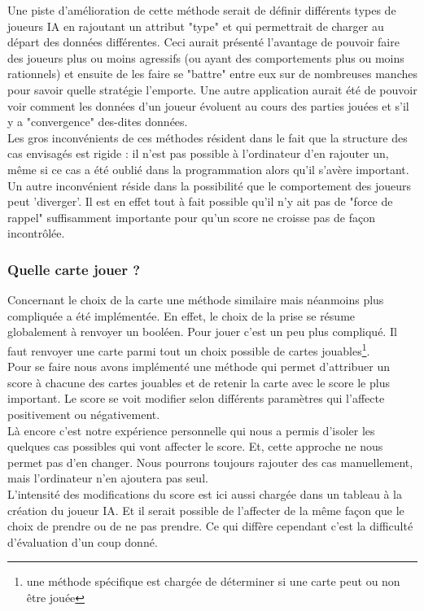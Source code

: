 \documentclass[a4paper,11pt]{article}
\begin{document}
Une piste d'amélioration de cette méthode serait de définir différents types de joueurs IA en rajoutant un attribut "type" et qui permettrait de charger au départ des données différentes. Ceci aurait présenté l'avantage de pouvoir faire des joueurs plus ou moins agressifs (ou ayant des comportements plus ou moins rationnels) et ensuite de les faire se "battre" entre eux sur de nombreuses manches pour savoir quelle stratégie l'emporte. Une autre application aurait été de pouvoir voir comment les données d'un joueur évoluent au cours des parties jouées et s'il y a "convergence" des-dites données.\\

Les gros inconvénients de ces méthodes résident dans le fait que la structure des cas envisagés est rigide : il n'est pas possible à l'ordinateur d'en rajouter un, même si ce cas a été oublié dans la programmation alors qu'il s'avère important. Un autre inconvénient réside dans la possibilité que le comportement des joueurs peut 'diverger'. Il est en effet tout à fait possible qu'il n'y ait pas de "force de rappel" suffisamment importante pour qu'un score ne croisse pas de façon incontrôlée.
\subsubsection{Quelle carte jouer ?}
Concernant le choix de la carte une méthode similaire mais néanmoins plus compliquée a été implémentée. En effet, le choix de la prise se résume globalement à renvoyer un booléen. Pour jouer c'est un peu plus compliqué. Il faut renvoyer une carte parmi tout un choix possible de cartes jouables\footnote{une méthode spécifique est chargée de déterminer si une carte peut ou non être jouée}. \\

Pour se faire nous avons implémenté une méthode qui permet d'attribuer un score à chacune des cartes jouables et de retenir la carte avec le score le plus important. Le score se voit modifier selon différents paramètres qui l'affecte positivement ou négativement.\\

Là encore c'est notre expérience personnelle qui nous a permis d'isoler les quelques cas possibles qui vont affecter le score. Et, cette approche ne nous permet pas d'en changer. Nous pourrons toujours rajouter des cas manuellement, mais l'ordinateur n'en ajoutera pas seul.\\

L'intensité des modifications du score est ici aussi chargée dans un tableau à la création du joueur IA. Et il serait possible de l'affecter de la même façon que le choix de prendre ou de ne pas prendre. Ce qui diffère cependant c'est la difficulté d'évaluation d'un coup donné.\\
\end{document}
